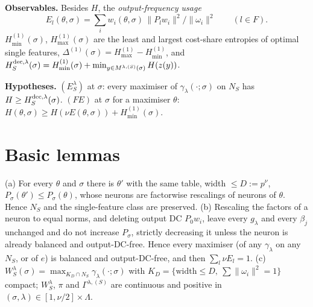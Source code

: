 \documentclass[11pt]{article}
\theoremstyle{remark}\newtheorem{remark}[theorem]{Remark}
\begin{document}
\textbf{Observables.} Besides $H$, the \emph{output-frequency usage}
\[E_l(\theta,\sigma)=\sum_iw_i(\theta,\sigma)\,\|P_lw_i\|^2/\|\omega_i\|^2\qquad(l\in F).\]
$H^{(1)}_{\min}(\sigma)$, $H^{(1)}_{\max}(\sigma)$ are the least and largest cost-share entropies of optimal single features,
$\Delta^{(1)}(\sigma)=H^{(1)}_{\max}-H^{(1)}_{\min}$, and
$H^{\rm dec,\lambda}_S(\sigma)=H^{(1)}_{\min}(\sigma)+\min_{y\in M^{\lambda,(S)}(\sigma)}H(z(y))$.

\textbf{Hypotheses.} $(E^\lambda_S)$ at $\sigma$: every maximiser of $\gamma_\lambda(\cdot;\sigma)$ on $N_S$ has
$H\ge H^{\rm dec,\lambda}_S(\sigma)$. $(FE)$ at $\sigma$ for a maximiser $\theta$:
$H(\theta,\sigma)\ge H(\nu E(\theta,\sigma))+H^{(1)}_{\min}(\sigma)$.

\section{Basic lemmas}
\begin{lemma}\label{l:basic}
(a) For every $\theta$ and $\sigma$ there is $\theta'$ with the same table, width $\le D:=p^\nu$, $P_\sigma(\theta')\le P_\sigma(\theta)$,
whose neurons are factorwise rescalings of neurons of $\theta$. Hence $N_S$ and the single-feature class are preserved.
(b) Rescaling the factors of a neuron to equal norms, and deleting output DC $P_0w_i$, leave every $g_\lambda$ and every
$\beta_j$ unchanged and do not increase $P_\sigma$, strictly decreasing it unless the neuron is already balanced and
output-DC-free. Hence every maximiser (of any $\gamma_\lambda$ on any $N_S$, or of $e$) is balanced and output-DC-free, and
then $\sum_l\nu E_l=1$.
(c) $W^\lambda_S(\sigma)=\max_{K_D\cap N_S}\gamma_\lambda(\cdot;\sigma)$ with $K_D=\{\text{width}\le D,\ \sum\|\omega_i\|^2=1\}$
compact; $W^\lambda_S$, $\pi$ and $\Gamma^{\lambda,(S)}$ are continuous and positive in $(\sigma,\lambda)\in[1,\nu/2]\times\Lambda$.
\end{lemma}
\end{document}
